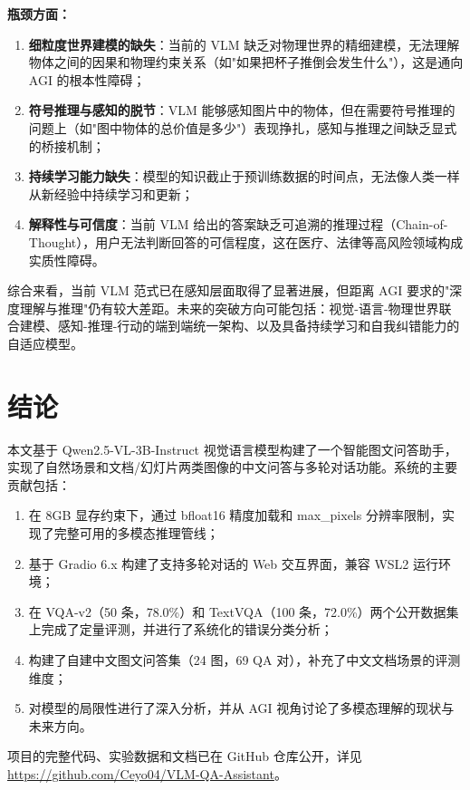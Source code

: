 \documentclass{SYSUReport}
\begin{document}
\textbf{瓶颈方面：}
\begin{enumerate}[label=(\arabic*)]
    \item \textbf{细粒度世界建模的缺失}：当前的 VLM 缺乏对物理世界的精细建模，无法理解物体之间的因果和物理约束关系（如"如果把杯子推倒会发生什么"），这是通向 AGI 的根本性障碍；
    \item \textbf{符号推理与感知的脱节}：VLM 能够感知图片中的物体，但在需要符号推理的问题上（如"图中物体的总价值是多少"）表现挣扎，感知与推理之间缺乏显式的桥接机制；
    \item \textbf{持续学习能力缺失}：模型的知识截止于预训练数据的时间点，无法像人类一样从新经验中持续学习和更新；
    \item \textbf{解释性与可信度}：当前 VLM 给出的答案缺乏可追溯的推理过程（Chain-of-Thought），用户无法判断回答的可信程度，这在医疗、法律等高风险领域构成实质性障碍。
\end{enumerate}

综合来看，当前 VLM 范式已在感知层面取得了显著进展，但距离 AGI 要求的"深度理解与推理"仍有较大差距。未来的突破方向可能包括：视觉-语言-物理世界联合建模、感知-推理-行动的端到端统一架构、以及具备持续学习和自我纠错能力的自适应模型。

\section{结论}

本文基于 Qwen2.5-VL-3B-Instruct 视觉语言模型构建了一个智能图文问答助手，实现了自然场景和文档/幻灯片两类图像的中文问答与多轮对话功能。系统的主要贡献包括：

\begin{enumerate}[label=(\arabic*)]
    \item 在 8GB 显存约束下，通过 bfloat16 精度加载和 max\_pixels 分辨率限制，实现了完整可用的多模态推理管线；
    \item 基于 Gradio 6.x 构建了支持多轮对话的 Web 交互界面，兼容 WSL2 运行环境；
    \item 在 VQA-v2（50 条，78.0\%）和 TextVQA（100 条，72.0\%）两个公开数据集上完成了定量评测，并进行了系统化的错误分类分析；
    \item 构建了自建中文图文问答集（24 图，69 QA 对），补充了中文文档场景的评测维度；
    \item 对模型的局限性进行了深入分析，并从 AGI 视角讨论了多模态理解的现状与未来方向。
\end{enumerate}

项目的完整代码、实验数据和文档已在 GitHub 仓库公开，详见 \url{https://github.com/Ceyo04/VLM-QA-Assistant}。

\newpage


\end{document}
